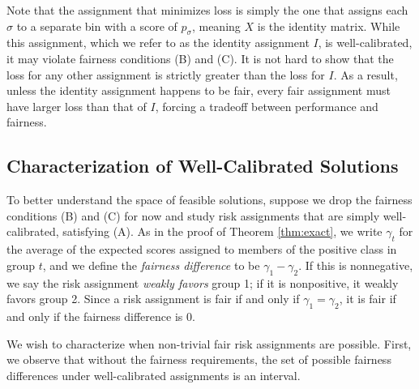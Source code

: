 \documentclass[11pt]{article}
\begin{document}
Note that the assignment that minimizes loss is simply the one that
assigns each $\sigma$ to a separate bin with a score of $p_{\sigma}$,
meaning $X$ is the identity matrix. While this assignment, which we
refer to as the identity assignment $I$, is well-calibrated, it may
violate fairness conditions (B) and (C).  It is not hard to show that the
loss for any other assignment is strictly greater than the loss for
$I$. As a result, unless the identity assignment happens to be fair,
every fair assignment must have larger loss than that of $I$, forcing a
tradeoff between performance and fairness.

% 

\subsection{Characterization of Well-Calibrated Solutions}

To better understand the space of feasible solutions, suppose we drop the
fairness conditions (B) and (C) for now and study risk assignments that are
simply well-calibrated, satisfying (A). As in the proof of Theorem
\ref{thm:exact}, we write $\gamma_t$ for the average of the expected
scores assigned 
to members of the positive class in group $t$, and we define the
{\em fairness difference} to be $\gamma_1 - \gamma_2$. If this is nonnegative,
we say the risk assignment {\em weakly favors} group 1; if it is nonpositive, it
weakly favors group 2. Since a risk assignment is fair if and only if $\gamma_1
= \gamma_2$, it is fair if and only if the fairness difference is 0.

We wish to characterize when non-trivial fair risk assignments are possible.
First, we observe that without the fairness requirements, the set of possible
fairness differences under well-calibrated assignments is an interval.
\end{document}

